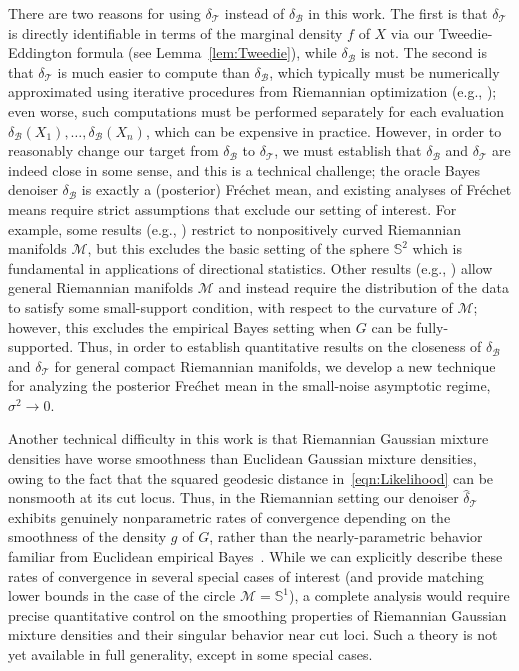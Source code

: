 \documentclass[preprint]{imsart}
\theoremstyle{plain}
\theoremstyle{definition}
\newcommand{\Mcal}{\mathcal{M}}
\newcommand{\B}{\mathcal{B}}
\newcommand{\T}{\mathcal{T}}
\begin{document}
    There are two reasons for using $\delta_\T$ instead of $\delta_{\B}$ in this work.
    The first is that $\delta_{\T}$ is directly identifiable in terms of the marginal density $f$ of $X$ via our Tweedie-Eddington formula (see Lemma~\ref{lem:Tweedie}), while $\delta_{\B}$ is not.
    The second is that $\delta_{\T}$ is much easier to compute than $\delta_{\B}$, which typically must be numerically approximated using iterative procedures from Riemannian optimization (e.g., \cite{FrechetCircle, Chakraborty_2015_ICCV, StiefelStatistics, FrechetSphere, GeomStats, TreeOptimality}); even worse, such computations must be performed separately for each evaluation $\delta_{\B}(X_1),\ldots, \delta_{\B}(X_n)$, which can be expensive in practice.    
    However, in order to reasonably change our target from $\delta_{\B}$ to $\delta_{\T}$, we must establish that $\delta_{\B}$ and $\delta_{\T}$ are indeed close in some sense, and this is a technical challenge; the oracle Bayes denoiser $\delta_{\B}$ is exactly a (posterior) Fr\'echet mean, and existing analyses of Fr\'echet means require strict assumptions that exclude our setting of interest.
    For example, some results (e.g., \cite{BrunelSerresI,SchoetzHadamard,YunPark}) restrict to nonpositively curved Riemannian manifolds $\Mcal$, but this excludes the basic setting of the sphere $\mathbb{S}^2$ which is fundamental in applications of directional statistics.
    Other results (e.g., \cite{Escande,BrunelSerresII,EltznerHuckemann,HundrieserEltznerHuckemann,SchoetzQuadruple}) allow general Riemannian manifolds $\Mcal$ and instead require the distribution of the data to satisfy some small-support condition, with respect to the curvature of $\Mcal$; however, this excludes the empirical Bayes setting when $G$ can be  fully-supported.
    Thus, in order to establish quantitative results on the closeness of $\delta_{\B}$ and $\delta_{\T}$ for general compact Riemannian manifolds, we develop a new technique for analyzing the posterior Fre\'chet mean in the small-noise asymptotic regime, $\sigma^2\to 0$.
    
    Another technical difficulty in this work is that Riemannian Gaussian mixture densities have worse smoothness than Euclidean Gaussian mixture densities, owing to the fact that the squared geodesic distance in~\eqref{eqn:Likelihood} can be nonsmooth at its cut locus.
    Thus, in the Riemannian setting our denoiser $\hat{\delta}_{\T}$ exhibits genuinely nonparametric rates of convergence depending on the smoothness of the density $g$ of $G$, rather than the nearly-parametric behavior familiar from Euclidean empirical Bayes~\cite{JiangZhang, brown2009nonparametric, SahaGuntuboyina}.
    While we can explicitly describe these rates of convergence in several special cases of interest (and provide matching lower bounds in the case of the circle $\Mcal=\mathbb{S}^1$), a complete analysis would require precise quantitative control on the smoothing properties of Riemannian Gaussian mixture densities and their singular behavior near cut loci.
    Such a theory is not yet available in full generality, except in some special cases.
\end{document}
